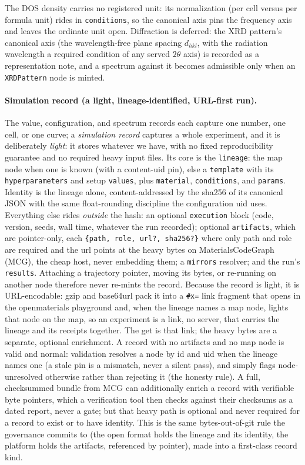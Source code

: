 \documentclass[11pt,a4paper]{article}
\begin{document}
The DOS density carries no registered unit: its normalization (per cell versus
per formula unit) rides in \texttt{conditions}, so the canonical axis pins the
frequency axis and leaves the ordinate unit open. Diffraction is deferred: the
XRD pattern's canonical axis (the wavelength-free plane spacing $d_{hkl}$, with
the radiation wavelength a required condition of any served $2\theta$ axis) is
recorded as a representation note, and a spectrum against it becomes admissible
only when an \texttt{XRDPattern} node is minted.

\paragraph{Simulation record (a light, lineage-identified, URL-first run).} The
value, configuration, and spectrum records each capture one number, one cell, or
one curve; a \emph{simulation record} captures a whole experiment, and it is
deliberately \emph{light}: it stores whatever we have, with no fixed
reproducibility guarantee and no required heavy input files. Its core is the
\texttt{lineage}: the map node when one is known (with a content-uid pin), else a
\texttt{template} with its \texttt{hyperparameters} and setup \texttt{values},
plus \texttt{material}, \texttt{conditions}, and \texttt{params}. Identity is the
lineage alone, content-addressed by the sha256 of its canonical JSON with the same
float-rounding discipline the configuration uid uses. Everything else rides
\emph{outside} the hash: an optional \texttt{execution} block (code, version,
seeds, wall time, whatever the run recorded); optional \texttt{artifacts}, which
are pointer-only, each \texttt{\{path, role, url?, sha256?\}} where only path and
role are required and the url points at the heavy bytes on MaterialsCodeGraph
(MCG), the cheap host, never embedding them; a \texttt{mirrors} resolver; and the
run's \texttt{results}. Attaching a trajectory pointer, moving its bytes, or
re-running on another node therefore never re-mints the record. Because the
record is light, it is URL-encodable: gzip and base64url pack it into a
\texttt{\#x=} link fragment that opens in the openmaterials playground and, when
the lineage names a map node, lights that node on the map, so an experiment is a
link, no server, that carries the lineage and its receipts together. The get is
that link; the heavy bytes are a separate, optional enrichment. A record with no
artifacts and no map node is valid and normal: validation resolves a node by id
and uid when the lineage names one (a stale pin is a mismatch, never a silent
pass), and simply flags node-unresolved otherwise rather than rejecting it (the
honesty rule). A full, checksummed bundle from MCG can additionally enrich a
record with verifiable byte pointers, which a verification tool then checks
against their checksums as a dated report, never a gate; but that heavy path is
optional and never required for a record to exist or to have identity. This is
the same bytes-out-of-git rule the governance commits to (the open format holds
the lineage and its identity, the platform holds the artifacts, referenced by
pointer), made into a first-class record kind.
\end{document}

